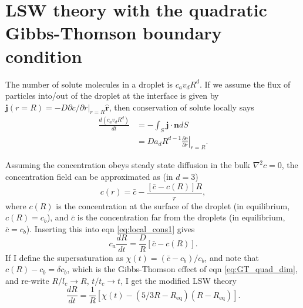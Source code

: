 \documentclass[12pt]{article}
\begin{document}
\section{LSW theory with the quadratic Gibbs-Thomson boundary condition}
The number of solute molecules in a droplet is $c_av_dR^d$. If we assume the flux of particles into/out of the droplet at the interface is given by $\bm{j}(r=R)=-D\partial c/\partial r\lvert_{r=R}\hat{\bm{r}}$, then conservation of solute locally says
\begin{align}\label{eq:local_cons1}
\frac{d (c_av_dR^d)}{dt}&=-\int_S \bm{j}\cdot \bm{n} dS\nonumber\\
&=Da_dR^{d-1}\left.\frac{\partial c}{\partial r}\right|_{r=R}.
\end{align}

Assuming the concentration obeys steady state diffusion in the bulk $\nabla^2c=0$, the concentration field can be approximated as (in $d=3$)
\begin{equation}\label{eq:c_field}
c(r)=\bar{c}-\frac{[\bar{c}-c(R)]R}{r},
\end{equation}
where $c(R)$ is the concentration at the surface of the droplet (in equilibrium, $c(R)=c_b$), and $\bar{c}$ is the concentration far from the droplets (in equilibrium, $\bar{c}=c_b$). Inserting this into eqn \ref{eq:local_cons1} gives
\begin{equation}\label{eq:dimensional_LSW}
c_a\frac{dR}{dt}=\frac{D}{R}[\bar{c}-c(R)].
\end{equation}
If I define the supersaturation as $\chi(t)=(\bar{c}-c_b)/c_b$, and note that $c(R)-c_b=\delta c_b$, which is the Gibbs-Thomson effect of eqn \ref{eq:GT_quad_dim}, and re-write $R/l_c\to R$, $t/t_c\to t$, I get the modified LSW theory
\begin{equation}\label{eq:Rdot}
\frac{dR}{dt}=\frac{1}{R}\left[\chi(t)-(5/3R-R_{\text{eq}})(R-R_{\text{eq}})\right].
\end{equation}
\end{document}
